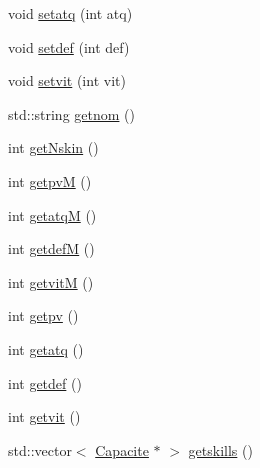 \begin{DoxyCompactItemize}
\item 
void \hyperlink{class_vaisseau_a5dac2a3814de298d8d515c20b7463397}{setatq} (int atq)
\item 
void \hyperlink{class_vaisseau_aa6a93a1d1bfd8f7bac3e079fff6d84fa}{setdef} (int def)
\item 
void \hyperlink{class_vaisseau_a86c2165e77892f03e8d08f1e509e9b10}{setvit} (int vit)
\item 
std\+::string \hyperlink{class_vaisseau_acbe2e5af7beda381d21392d4eb539761}{getnom} ()
\item 
int \hyperlink{class_vaisseau_aaecdafade1e84272e58cc97558f7c5c3}{get\+Nskin} ()
\item 
int \hyperlink{class_vaisseau_aac552ebb8c5b199c0f0e38b1f1cd95af}{getpvM} ()
\item 
int \hyperlink{class_vaisseau_a893c8a6199e3e79460891fafb0b16fba}{getatqM} ()
\item 
int \hyperlink{class_vaisseau_aa983d5040f7c19a9dfcb907618fda321}{getdefM} ()
\item 
int \hyperlink{class_vaisseau_a78f7e268cdb61a39e3292e80309a4ca8}{getvitM} ()
\item 
int \hyperlink{class_vaisseau_ae8e571f83be3f2bc1b961841f872265e}{getpv} ()
\item 
int \hyperlink{class_vaisseau_a03d9f614943176d1e1d71d99f9d7f465}{getatq} ()
\item 
int \hyperlink{class_vaisseau_a48d7facfa7c34a784bfbee4c4b1100ce}{getdef} ()
\item 
int \hyperlink{class_vaisseau_a3ca57eda788c37034f9769d79f814dac}{getvit} ()
\item 
std\+::vector$<$ \hyperlink{class_capacite}{Capacite} $\ast$ $>$ \hyperlink{class_vaisseau_a40cb016e98f0f928b32b3b4a47e27599}{getskills} ()
\end{DoxyCompactItemize}
